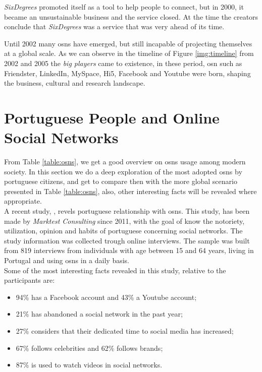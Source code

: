\textit{SixDegrees} promoted itself as a tool to help people to connect, but in 2000, it became an
unsustainable business and the service closed. At the time the creators conclude that
\textit{SixDegrees} was a service that was very ahead of its time.

Until 2002 many \glspl{osn} have emerged, but still incapable of projecting themselves at a global scale.
As we can observe in the timeline of Figure \ref{img:timeline} from 2002 and 2005 the \textit{big players} came to existence, in these period, \gls{osn}
such as Friendster, LinkedIn, MySpace, Hi5, Facebook and Youtube were born, shaping the business, cultural
and research landscape.


\section{Portuguese People and Online Social Networks}
From Table \ref{table:osns}, we get a good overview on \glspl{osn} usage among modern society. In this section we do a deep exploration of the most adopted \glspl{osn} by portuguese citizens,
and get to compare then with the more global scenario presented in Table \ref{table:osns}, also, other interesting facts will be revealed where appropriate.\\
\indent A recent study, \cite{marktest2016}, revels portuguese relationship with \glspl{osn}. This study, has been made by \textit{Marktest Consulting} since 2011, with the goal of know the notoriety, utilization, opinion
and habits of portuguese concerning social networks. The study information was collected trough online interviews. The sample was built from 819 interviews from individuals with age between
15 and 64 years, living in Portugal and using \glspl{osn} in a daily basis.\\
\indent Some of the most interesting facts revealed in this study, relative to the participants are:
\begin{itemize}
  \item 94\% has a Facebook account and 43\% a Youtube account;
  \item 21\% has abandoned a social network in the past year;
  \item 27\% considers that their dedicated time to social media has increased;
  \item 67\% follows celebrities and 62\% follows brands;
  \item 87\% is used to watch videos in social networks.
\end{itemize}

